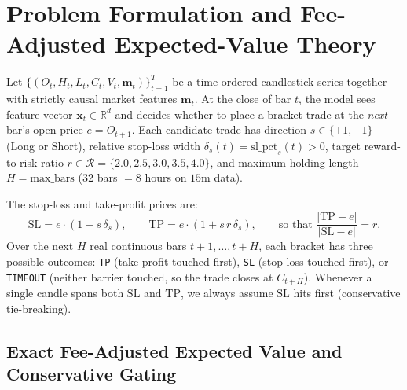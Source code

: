 \documentclass{article}
\newcommand{\TP}{\mathrm{TP}}
\newcommand{\SL}{\mathrm{SL}}
\begin{document}
\section{Problem Formulation and Fee-Adjusted Expected-Value Theory}
\label{sec:theory}

Let $\{(O_t, H_t, L_t, C_t, V_t, \mathbf{m}_t)\}_{t=1}^T$ be a time-ordered candlestick series together with strictly causal market features $\mathbf{m}_t$. At the close of bar $t$, the model sees feature vector $\mathbf{x}_t \in \mathbb{R}^d$ and decides whether to place a bracket trade at the \emph{next} bar's open price $e = O_{t+1}$. Each candidate trade has direction $s \in \{+1, -1\}$ (Long or Short), relative stop-loss width $\delta_s(t) = \mathrm{sl\_pct}_s(t) > 0$, target reward-to-risk ratio $r \in \mathcal{R} = \{2.0, 2.5, 3.0, 3.5, 4.0\}$, and maximum holding length $H = \mathrm{max\_bars}$ ($32$ bars $= 8$ hours on $15\text{m}$ data).

The stop-loss and take-profit prices are:
\begin{equation}
  \SL = e \cdot (1 - s\,\delta_s), \qquad
  \TP = e \cdot (1 + s\,r\,\delta_s), \qquad
  \text{so that } \frac{|\TP - e|}{|\SL - e|} = r.
  \label{eq:barriers}
\end{equation}
Over the next $H$ real continuous bars $t+1, \dots, t+H$, each bracket has three possible outcomes: \texttt{TP} (take-profit touched first), \texttt{SL} (stop-loss touched first), or \texttt{TIMEOUT} (neither barrier touched, so the trade closes at $C_{t+H}$). Whenever a single candle spans both $\SL$ and $\TP$, we always assume $\SL$ hits first (conservative tie-breaking).

\subsection{Exact Fee-Adjusted Expected Value and Conservative Gating}
\end{document}

